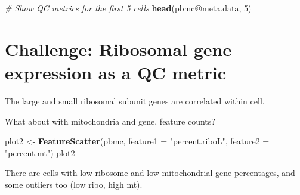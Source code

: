 \documentclass[
]{book}
\newenvironment{Shaded}{\begin{snugshade}}{\end{snugshade}}
\newcommand{\AttributeTok}[1]{\textcolor[rgb]{0.13,0.29,0.53}{#1}}
\newcommand{\CommentTok}[1]{\textcolor[rgb]{0.56,0.35,0.01}{\textit{#1}}}
\newcommand{\DecValTok}[1]{\textcolor[rgb]{0.00,0.00,0.81}{#1}}
\newcommand{\FunctionTok}[1]{\textcolor[rgb]{0.13,0.29,0.53}{\textbf{#1}}}
\newcommand{\NormalTok}[1]{#1}
\newcommand{\OtherTok}[1]{\textcolor[rgb]{0.56,0.35,0.01}{#1}}
\newcommand{\SpecialCharTok}[1]{\textcolor[rgb]{0.81,0.36,0.00}{\textbf{#1}}}
\newcommand{\StringTok}[1]{\textcolor[rgb]{0.31,0.60,0.02}{#1}}
\begin{document}
\begin{Shaded}
\begin{Highlighting}[]
\CommentTok{\# Show QC metrics for the first 5 cells}
\FunctionTok{head}\NormalTok{(pbmc}\SpecialCharTok{@}\NormalTok{meta.data, }\DecValTok{5}\NormalTok{)}
\end{Highlighting}
\end{Shaded}

\hypertarget{challenge-ribosomal-gene-expression-as-a-qc-metric}{%
\section{Challenge: Ribosomal gene expression as a QC metric}\label{challenge-ribosomal-gene-expression-as-a-qc-metric}}

\begin{Shaded}
\end{Shaded}

The large and small ribosomal subunit genes are correlated within cell.

What about with mitochondria and gene, feature counts?

\begin{Shaded}
\begin{Highlighting}[]
\NormalTok{plot2 }\OtherTok{\textless{}{-}} \FunctionTok{FeatureScatter}\NormalTok{(pbmc, }\AttributeTok{feature1 =} \StringTok{"percent.riboL"}\NormalTok{, }\AttributeTok{feature2 =} \StringTok{"percent.mt"}\NormalTok{)}
\NormalTok{plot2}
\end{Highlighting}
\end{Shaded}

There are cells with low ribosome and low mitochondrial gene percentages, and some outliers too (low ribo, high mt).
\end{document}
